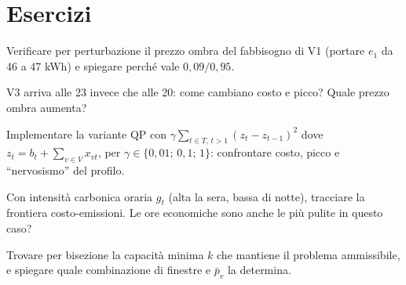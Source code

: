 \section{Esercizi}

\begin{esercizio}[verifica]
Verificare per perturbazione il prezzo ombra del fabbisogno di V1 (portare $e_1$ da
46 a 47 kWh) e spiegare perché vale $0{,}09/0{,}95$.
\end{esercizio}

\begin{esercizio}
V3 arriva alle 23 invece che alle 20: come cambiano costo e picco? Quale prezzo
ombra aumenta?
\end{esercizio}

\begin{esercizio}
Implementare la variante QP con $\gamma \sum_{t \in T,\, t>1} (z_t - z_{t-1})^2$ dove
$z_t = b_t + \sum_{v \in V} x_{vt}$, per $\gamma \in \{0{,}01;\, 0{,}1;\, 1\}$: confrontare
costo, picco e ``nervosismo'' del profilo.
\end{esercizio}

\begin{esercizio}[emissioni]
Con intensità carbonica oraria $g_t$ (alta la sera, bassa di notte), tracciare la
frontiera costo-emissioni. Le ore economiche sono anche le più pulite in questo caso?
\end{esercizio}

\begin{esercizio}
Trovare per bisezione la capacità minima $k$ che mantiene il problema ammissibile,
e spiegare quale combinazione di finestre e $\bar p_v$ la determina.
\end{esercizio}
